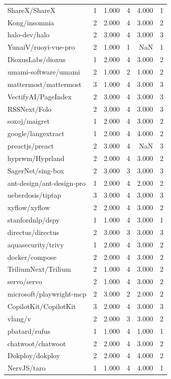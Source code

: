 \begin{tabular}{lrrrrr}
ShareX/ShareX & 1 & 1.000 & 4 & 4.000 & 1 \\
Kong/insomnia & 2 & 2.000 & 4 & 3.000 & 2 \\
halo-dev/halo & 2 & 3.000 & 4 & 3.000 & 3 \\
YunaiV/ruoyi-vue-pro & 2 & 1.000 & 1 & NaN & 1 \\
DioxusLabs/dioxus & 1 & 2.000 & 4 & 3.000 & 2 \\
umami-software/umami & 2 & 1.000 & 2 & 1.000 & 2 \\
mattermost/mattermost & 3 & 1.000 & 4 & 3.000 & 3 \\
VectifyAI/PageIndex & 2 & 3.000 & 4 & 3.000 & 3 \\
RSSNext/Folo & 2 & 3.000 & 4 & 3.000 & 3 \\
soxoj/maigret & 1 & 2.000 & 4 & 3.000 & 2 \\
google/langextract & 1 & 2.000 & 4 & 4.000 & 2 \\
preactjs/preact & 2 & 3.000 & 4 & NaN & 3 \\
hyprwm/Hyprland & 2 & 2.000 & 4 & 3.000 & 2 \\
SagerNet/sing-box & 2 & 3.000 & 3 & 3.000 & 3 \\
ant-design/ant-design-pro & 1 & 2.000 & 4 & 2.000 & 2 \\
ueberdosis/tiptap & 3 & 3.000 & 4 & 3.000 & 3 \\
xyflow/xyflow & 2 & 2.000 & 4 & 3.000 & 2 \\
stanfordnlp/dspy & 1 & 1.000 & 4 & 3.000 & 1 \\
directus/directus & 2 & 3.000 & 3 & 3.000 & 3 \\
aquasecurity/trivy & 1 & 2.000 & 4 & 3.000 & 2 \\
docker/compose & 2 & 2.000 & 4 & 3.000 & 2 \\
TriliumNext/Trilium & 2 & 1.000 & 4 & 3.000 & 2 \\
servo/servo & 2 & 1.000 & 4 & 3.000 & 2 \\
microsoft/playwright-mcp & 2 & 3.000 & 2 & 2.000 & 2 \\
CopilotKit/CopilotKit & 3 & 2.000 & 4 & 3.000 & 3 \\
vlang/v & 2 & 2.000 & 3 & 3.000 & 2 \\
pbatard/rufus & 1 & 1.000 & 4 & 1.000 & 1 \\
chatwoot/chatwoot & 2 & 2.000 & 4 & 3.000 & 2 \\
Dokploy/dokploy & 2 & 2.000 & 4 & 4.000 & 2 \\
NervJS/taro & 1 & 1.000 & 4 & 4.000 & 1 \\

\end{tabular}
